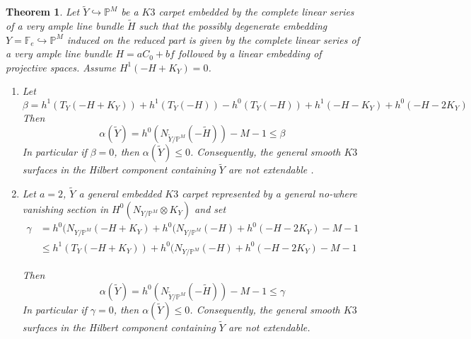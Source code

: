 \documentclass[11pt,twoside]{amsart}
\theoremstyle{plain}
\numberwithin{equation}{section}
\newtheorem{theorem}{Theorem}[section]
\theoremstyle{definition}
\begin{document}
\begin{theorem}\label{ZL for K3 carpets}
 Let $\widetilde{Y} \hookrightarrow \mathbb{P}^M$ be a $K3$ carpet embedded by the complete linear series of a very ample line bundle $\widetilde{H}$ such that the possibly degenerate embedding $Y = \mathbb{F}_e \hookrightarrow \mathbb{P}^M$ induced on the reduced part is given by the complete linear series of a very ample line bundle $H = aC_0+bf$ followed by a linear embedding of projective spaces. Assume $H^1(-H+K_Y) = 0$. 
 
 \begin{enumerate}
 \item Let $$\beta = h^1(T_Y(-H+K_Y)) + h^1(T_Y(-H)) - h^0(T_Y(-H)) +  h^1(-H-K_Y) + h^0(-H-2K_Y)$$ 
Then 
$$\alpha(\widetilde{Y}) = h^0(N_{\widetilde{Y}/\mathbb{P}^M}(-\widetilde{H}))-M-1 \leq  \beta$$ 
In particular if $\beta = 0$, then $\alpha(\widetilde{Y}) \leq 0$. Consequently, the general smooth $K3$ surfaces in the Hilbert component containing $\widetilde{Y}$ are not extendable .

\item Let $a = 2$, $\widetilde{Y}$ a general embedded $K3$ carpet represented by a general no-where vanishing section in $H^0(N_{Y/\mathbb{P}^M} \otimes K_Y)$ and set
\begin{align*}
    \gamma & =  h^0(N_{Y/\mathbb{P}^M}(-H+K_Y)+h^0(N_{Y/\mathbb{P}^M}(-H)+h^0(-H-2K_Y)-M-1 \\
    & \leq h^1(T_Y(-H+K_Y))+h^0(N_{Y/\mathbb{P}^M}(-H)+h^0(-H-2K_Y)-M-1
\end{align*}

Then 
$$\alpha(\widetilde{Y}) = h^0(N_{\widetilde{Y}/\mathbb{P}^M}(-\widetilde{H}))-M-1 \leq  \gamma$$ 
In particular if $\gamma = 0$, then $\alpha(\widetilde{Y}) \leq 0$. Consequently, the general smooth $K3$ surfaces in the Hilbert component containing $\widetilde{Y}$ are not extendable.


\end{enumerate}
\end{theorem}
\end{document}
